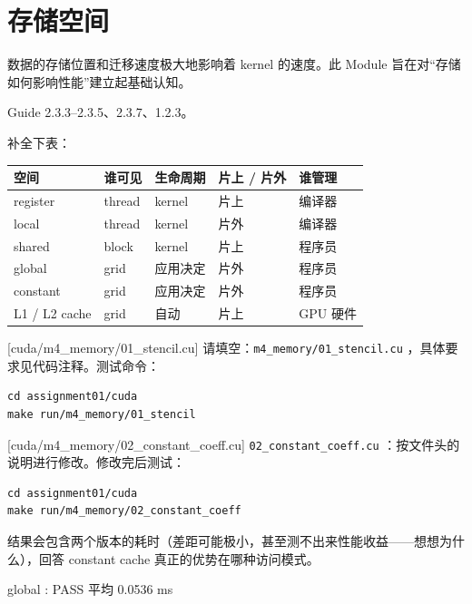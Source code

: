 \documentclass[11pt,a4paper,fontset=none]{ctexart}
\begin{document}
\section{存储空间}

数据的存储位置和迁移速度极大地影响着 kernel 的速度。此 Module 旨在对“存储如何影响性能”建立起基础认知。

\begin{reading}
Guide 2.3.3--2.3.5、2.3.7、1.2.3。
\end{reading}

补全下表：

\begin{center}\small
\begin{tabular}{@{}lp{8em}p{7em}p{6em}p{8em}@{}}
\toprule
空间 & 谁可见 & 生命周期 & 片上 / 片外 & 谁管理 \\
\midrule
register & thread & kernel & 片上 & 编译器 \\
local & thread & kernel & 片外 & 编译器 \\
shared & block & kernel & 片上 & 程序员 \\
global & grid & 应用决定 & 片外 & 程序员 \\
constant & grid & 应用决定 & 片外 & 程序员 \\
L1 / L2 cache & grid & 自动 & 片上 & GPU 硬件 \\
\bottomrule
\end{tabular}
\end{center}

[cuda/m4\_memory/01\_stencil.cu]
请填空：\texttt{m4\_memory/01\_stencil.cu} ，具体要求见代码注释。测试命令：

\begin{lstlisting}
cd assignment01/cuda
make run/m4_memory/01_stencil
\end{lstlisting}

[cuda/m4\_memory/02\_constant\_coeff.cu]
\texttt{02\_constant\_coeff.cu} ：按文件头的说明进行修改。修改完后测试：

\begin{lstlisting}
cd assignment01/cuda
make run/m4_memory/02_constant_coeff
\end{lstlisting}

结果会包含两个版本的耗时（差距可能极小，甚至测不出来性能收益——想想为什么），回答 constant cache 真正的优势在哪种访问模式。

global  : PASS  平均 0.0536 ms
\end{document}
